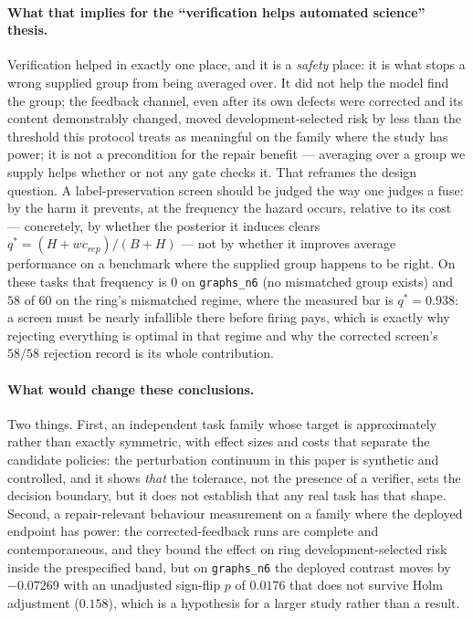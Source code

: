 \documentclass[11pt]{article}
\begin{document}
\paragraph{What that implies for the ``verification helps automated science'' thesis.}
Verification helped in exactly one place, and it is a \emph{safety} place: it is what stops a
wrong supplied group from being averaged over. It did not help the model find the group; the
feedback channel, even after its own defects were corrected and its content demonstrably changed,
moved development-selected risk by less than the threshold this protocol treats as meaningful on
the family where the study has power; it is not a precondition for the repair benefit --- averaging
over a group we supply helps whether or not any gate checks it. That reframes the design question.
A label-preservation screen should be judged the way one judges a fuse: by the harm it prevents, at
the frequency the hazard occurs, relative to its cost --- concretely, by whether the posterior it
induces clears $q^* = (H + w c_{rep})/(B+H)$ --- not by whether it improves average performance on a
benchmark where the supplied group happens to be right. On these tasks that frequency is
$0$ on \texttt{graphs\_n6} (no mismatched group exists) and $58$ of $60$ on the ring's mismatched
regime, where the measured bar is $q^* = 0.938$: a screen must be nearly infallible there before
firing pays, which is exactly why rejecting everything is optimal in that regime and why the
corrected screen's $58/58$ rejection record is its whole contribution.

\paragraph{What would change these conclusions.}
Two things. First, an independent task family whose target is approximately rather than exactly
symmetric, with effect sizes and costs that separate the candidate policies: the perturbation
continuum in this paper is synthetic and controlled, and it shows \emph{that} the tolerance, not
the presence of a verifier, sets the decision boundary, but it does not establish that any
real task has that shape. Second, a repair-relevant behaviour measurement on a family where the
deployed endpoint has power: the corrected-feedback runs are complete and contemporaneous, and
they bound the effect on ring development-selected risk inside the prespecified band, but on
\texttt{graphs\_n6} the deployed contrast moves by $-0.07269$ with an unadjusted sign-flip
$p$ of $0.0176$ that does not survive Holm adjustment ($0.158$), which is a hypothesis for a
larger study rather than a result.
\end{document}
